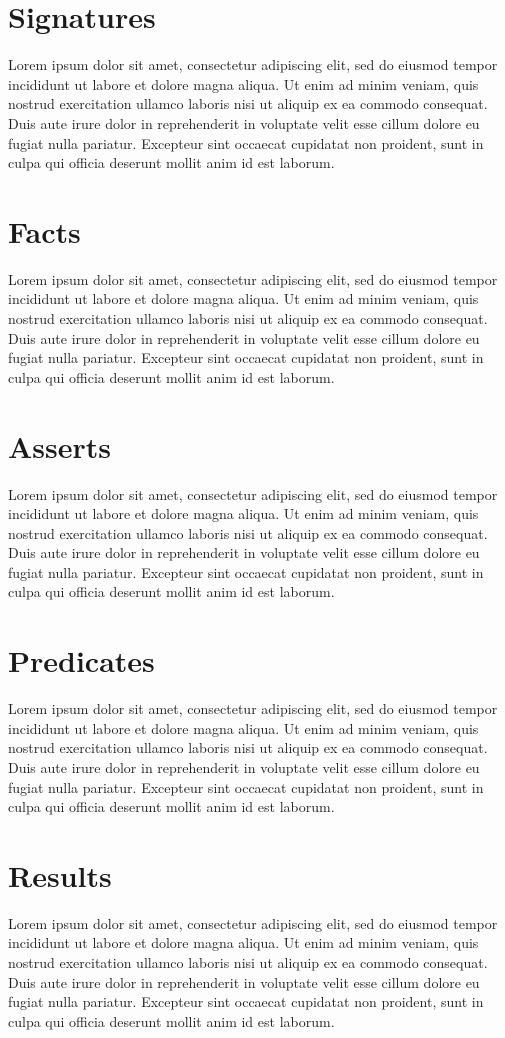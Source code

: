 \section{Signatures}
Lorem ipsum dolor sit amet, consectetur adipiscing elit, sed do eiusmod tempor incididunt ut labore et dolore magna aliqua. 
Ut enim ad minim veniam, quis nostrud exercitation ullamco laboris nisi ut aliquip ex ea commodo consequat. 
Duis aute irure dolor in reprehenderit in voluptate velit esse cillum dolore eu fugiat nulla pariatur. 
Excepteur sint occaecat cupidatat non proident, sunt in culpa qui officia deserunt mollit anim id est laborum.
\section{Facts}
Lorem ipsum dolor sit amet, consectetur adipiscing elit, sed do eiusmod tempor incididunt ut labore et dolore magna aliqua. 
Ut enim ad minim veniam, quis nostrud exercitation ullamco laboris nisi ut aliquip ex ea commodo consequat. 
Duis aute irure dolor in reprehenderit in voluptate velit esse cillum dolore eu fugiat nulla pariatur. 
Excepteur sint occaecat cupidatat non proident, sunt in culpa qui officia deserunt mollit anim id est laborum.
\section{Asserts}
Lorem ipsum dolor sit amet, consectetur adipiscing elit, sed do eiusmod tempor incididunt ut labore et dolore magna aliqua. 
Ut enim ad minim veniam, quis nostrud exercitation ullamco laboris nisi ut aliquip ex ea commodo consequat. 
Duis aute irure dolor in reprehenderit in voluptate velit esse cillum dolore eu fugiat nulla pariatur. 
Excepteur sint occaecat cupidatat non proident, sunt in culpa qui officia deserunt mollit anim id est laborum.
\section{Predicates}
Lorem ipsum dolor sit amet, consectetur adipiscing elit, sed do eiusmod tempor incididunt ut labore et dolore magna aliqua. 
Ut enim ad minim veniam, quis nostrud exercitation ullamco laboris nisi ut aliquip ex ea commodo consequat. 
Duis aute irure dolor in reprehenderit in voluptate velit esse cillum dolore eu fugiat nulla pariatur. 
Excepteur sint occaecat cupidatat non proident, sunt in culpa qui officia deserunt mollit anim id est laborum.
\section{Results}
Lorem ipsum dolor sit amet, consectetur adipiscing elit, sed do eiusmod tempor incididunt ut labore et dolore magna aliqua. 
Ut enim ad minim veniam, quis nostrud exercitation ullamco laboris nisi ut aliquip ex ea commodo consequat. 
Duis aute irure dolor in reprehenderit in voluptate velit esse cillum dolore eu fugiat nulla pariatur. 
Excepteur sint occaecat cupidatat non proident, sunt in culpa qui officia deserunt mollit anim id est laborum.
